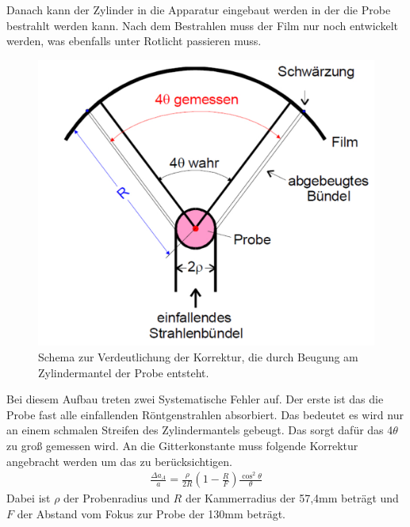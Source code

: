 Danach kann der Zylinder in die Apparatur eingebaut werden in der die Probe bestrahlt werden kann.
Nach dem Bestrahlen muss der Film nur noch entwickelt werden, was ebenfalls unter Rotlicht passieren muss.
\FloatBarrier
\begin{figure}[h!]
	\centering
	\includegraphics[scale=0.4]{../Grafiken/ErsteKorrektur.pdf}
	\caption{Schema zur Verdeutlichung der Korrektur, die durch Beugung am Zylindermantel der Probe entsteht\cite{V41}.}
\end{figure}
\FloatBarrier
Bei diesem Aufbau treten zwei Systematische Fehler auf. Der erste ist das die Probe fast alle einfallenden Röntgenstrahlen absorbiert. Das bedeutet es wird nur an einem schmalen Streifen des Zylindermantels gebeugt. Das sorgt dafür das 4$\theta$ zu groß gemessen wird. An die Gitterkonstante muss folgende Korrektur angebracht werden um das zu berücksichtigen.
\begin{align}
	\frac{\Delta a_A}{a}=\frac{\rho}{2R}\left(1-\frac{R}{F}\right)\frac{\cos^2\theta}{\theta}
\end{align}
Dabei ist $\rho$ der Probenradius und $R$ der Kammerradius der 57,4mm beträgt und $F$ der Abstand vom Fokus zur Probe der 130mm beträgt.\\
\FloatBarrier
